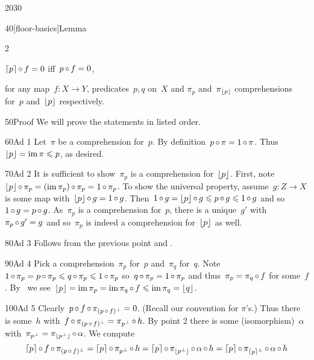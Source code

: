 \begin{parsec}{2030}
\begin{point}{40}[floor-basics]{Lemma}
\begin{multicols}{2}
\begin{enumerate}
    $\left\lceil p\right\rceil \mathop{\circ} f =0$ iff~$p \mathop{\circ} f = 0$,
\end{enumerate}
\end{multicols}
\noindent for any map~$f\colon X \to Y$,
    predicates~$p,q$ on~$X$ and
$\pi_p$ and~$\pi_{\left\lfloor p\right\rfloor}$
    comprehensions for~$p$ and~$\left\lfloor p\right\rfloor$ respectively.
\begin{point}{50}{Proof}%
We will prove the statements in listed order.
\begin{point}{60}{Ad 1}%
    Let~$\pi$ be a comprehension for~$p$.
    By definition~$p \mathop{\circ} \pi = 1 \mathop{\circ} \pi$.
    Thus~$\left\lfloor p\right\rfloor = \operatorname{im} \pi \leqslant p$, as desired.
\end{point}
\begin{point}{70}{Ad 2}%
It is sufficient to show~$\pi_p$ is a comprehension for~$\left\lfloor p\right\rfloor$.
First, note~$\left\lfloor p\right\rfloor\mathop{\circ} \pi_p = (\operatorname{im} \pi_p) \mathop{\circ} \pi_p = 1 \mathop{\circ} \pi_p$.
To show the universal property,
    assume~$g\colon Z \to X$
    is some map with~$\left\lfloor p\right\rfloor \mathop{\circ} g = 1 \mathop{\circ} g$.
Then~$1 \mathop{\circ} g = \left\lfloor p\right\rfloor \mathop{\circ} g \leqslant p \mathop{\circ} g \leqslant 1 \mathop{\circ} g$
    and so~$1 \mathop{\circ} g = p \mathop{\circ} g$.
As~$\pi_p$ is a comprehension for~$p$,
    there is a unique~$g'$ with~$\pi_p \mathop{\circ}  g' = g$
    and so~$\pi_p$ is indeed a comprehension for~$\left\lfloor p\right\rfloor$ as well.
\end{point}
\begin{point}{80}{Ad 3}%
Follows from the previous point and .
\end{point}
\begin{point}{90}{Ad 4}%
Pick a comprehension~$\pi_p$ for~$p$ and~$\pi_q$ for~$q$.
Note~$1 \mathop{\circ} \pi_p = p \mathop{\circ} \pi_p
                \leqslant q \mathop{\circ} \pi_p \leqslant 1 \mathop{\circ} \pi_p $
so~$q \mathop{\circ} \pi_p = 1 \mathop{\circ} \pi_p$
and thus~$\pi_p = \pi_q \mathop{\circ} f$ for some~$f$.
By~
    we see~$\left\lfloor p\right\rfloor = \operatorname{im} \pi_p = \operatorname{im} \pi_q \mathop{\circ} f \leqslant \operatorname{im} \pi_q = \left\lfloor q\right\rfloor$.
\end{point}
\begin{point}{100}{Ad 5}%
Clearly~$p \mathop{\circ} f \mathop{\circ} \pi_{(p \mathop{\circ} f)^\perp} = 0$.
(Recall our convention  for $\pi$'s.)
Thus there is some~$h$
with~$f \mathop{\circ} \pi_{(p \mathop{\circ} f)^\perp} = \pi_{p^\perp}\mathop{\circ} h$.
By point 2 there is some (isomorphism)~$\alpha$
    with~$\pi_{p^\perp} =\pi_{\left\lfloor p^\perp\right\rfloor} \mathop{\circ} \alpha$.
    We compute
\begin{equation*}
    \ceil{p} \after f \after \pi_{(p \after f)^\perp}
        = \ceil{p} \after \pi_{p^\perp}\after h
        = \ceil{p} \after \pi_{\floor{p^\perp}}\after \alpha\after h
    = \ceil{p} \after \pi_{\ceil{p}^\perp}\after \alpha\after h

\end{equation*}
\end{point}
\end{point}
\end{point}
\end{parsec}
